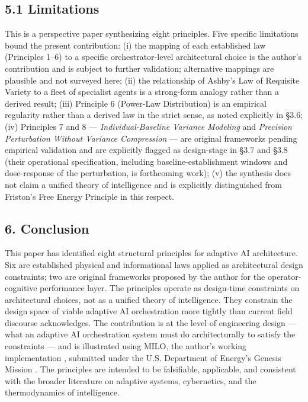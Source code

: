 \subsection{5.1 Limitations}\label{limitations}

This is a perspective paper synthesizing eight principles. Five specific
limitations bound the present contribution: (i) the mapping of each
established law (Principles 1--6) to a specific orchestrator-level
architectural choice is the author's contribution and is subject to
further validation; alternative mappings are plausible and not surveyed
here; (ii) the relationship of Ashby's Law of Requisite Variety \cite{ref6}
to a fleet of specialist agents is a strong-form analogy rather than a
derived result; (iii) Principle 6 (Power-Law Distribution) is an
empirical regularity rather than a derived law in the strict sense, as
noted explicitly in §3.6; (iv) Principles 7 and 8 ---
\emph{Individual-Baseline Variance Modeling} and \emph{Precision
Perturbation Without Variance Compression} --- are original frameworks
pending empirical validation and are explicitly flagged as design-stage
in §3.7 and §3.8 (their operational specification, including
baseline-establishment windows and dose-response of the perturbation, is
forthcoming work); (v) the synthesis does not claim a unified theory of
intelligence and is explicitly distinguished from Friston's Free Energy
Principle \cite{ref3} in this respect.

\subsection{6. Conclusion}\label{conclusion}

This paper has identified eight structural principles for adaptive AI
architecture. Six are established physical and informational laws
applied as architectural design constraints; two are original frameworks
proposed by the author for the operator-cognitive performance layer. The
principles operate as design-time constraints on architectural choices,
not as a unified theory of intelligence. They constrain the design space
of viable adaptive AI orchestration more tightly than current field
discourse acknowledges. The contribution is at the level of engineering
design --- what an adaptive AI orchestration system must do
architecturally to satisfy the constraints --- and is illustrated using
MILO, the author's working implementation \cite{ref1}, submitted under the
U.S. Department of Energy's Genesis Mission \cite{ref2}. The principles are
intended to be falsifiable, applicable, and consistent with the broader
literature on adaptive systems, cybernetics, and the thermodynamics of
intelligence.

